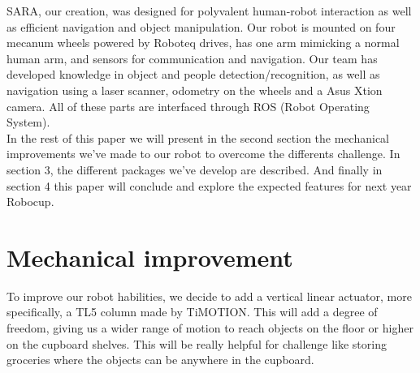 \documentclass[runningheads,a4paper]{llncs}
\begin{document}
SARA, our creation, was designed for polyvalent human-robot interaction as well as efficient navigation and object manipulation. Our robot is mounted on four mecanum wheels powered by Roboteq drives, has one arm mimicking a normal human arm, and sensors for communication and navigation. Our team has developed knowledge in object and people detection/recognition, as well as navigation using a laser scanner, odometry on the wheels and a Asus Xtion camera. All of these parts are interfaced through ROS (Robot Operating System). \\

In the rest of this paper we will present in the second section the mechanical improvements we've made to our robot to overcome the differents challenge. In section 3, the different packages we've develop are described. And finally in section 4 this paper will conclude and explore the expected features for next year Robocup. \\

\section{Mechanical improvement}

\tab To improve our robot habilities, we decide to add a vertical linear actuator, more specifically, a TL5 column made by TiMOTION. This will add a degree of freedom, giving us a wider range of motion to reach objects on the floor or higher on the cupboard shelves. This will be really helpful for challenge like storing groceries where the objects can be anywhere in the cupboard. \\
\end{document}
